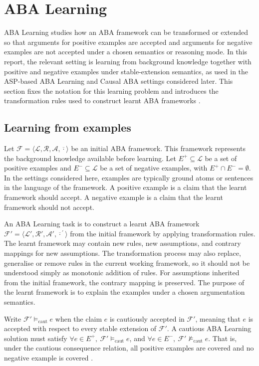 \section{ABA Learning}
ABA Learning studies how an ABA framework can be transformed or extended so that arguments for positive examples are accepted and arguments for negative examples are not accepted under a chosen semantics or reasoning mode. In this report, the relevant setting is learning from background knowledge together with positive and negative examples under stable-extension semantics, as used in the ASP-based ABA Learning and Causal ABA settings considered later. This section fixes the notation for this learning problem and introduces the transformation rules used to construct learnt ABA frameworks \cite{proietti2022learning,de2023aba}.

\subsection{Learning from examples}

Let \(\mathcal{F} = \langle \mathcal{L}, \mathcal{R}, \mathcal{A}, \overline{\cdot} \rangle\) be an initial ABA framework. This framework represents the background knowledge available before learning. Let \(E^+ \subseteq \mathcal{L}\) be a set of positive examples and \(E^- \subseteq \mathcal{L}\) be a set of negative examples, with \(E^+ \cap E^- = \emptyset\). In the settings considered here, examples are typically ground atoms or sentences in the language of the framework. A positive example is a claim that the learnt framework should accept. A negative example is a claim that the learnt framework should not accept.

An ABA Learning task is to construct a learnt ABA framework \(\mathcal{F}' = \langle \mathcal{L}', \mathcal{R}', \mathcal{A}', \overline{\cdot}^{\,\prime} \rangle\) from the initial framework by applying transformation rules. The learnt framework may contain new rules, new assumptions, and contrary mappings for new assumptions. The transformation process may also replace, generalise or remove rules in the current working framework, so it should not be understood simply as monotonic addition of rules. For assumptions inherited from the initial framework, the contrary mapping is preserved. The purpose of the learnt framework is to explain the examples under a chosen argumentation semantics.

Write \(\mathcal{F}' \models_{\mathrm{caut}} e\) when the claim \(e\) is cautiously accepted in \(\mathcal{F}'\), meaning that \(e\) is accepted with respect to every stable extension of \(\mathcal{F}'\). A cautious ABA Learning solution must satisfy \(\forall e \in E^+,\ \mathcal{F}' \models_{\mathrm{caut}} e\), and \(\forall e \in E^-,\ \mathcal{F}' \not\models_{\mathrm{caut}} e\). That is, under the cautious consequence relation, all positive examples are covered and no negative example is covered \cite{de2023aba}.

